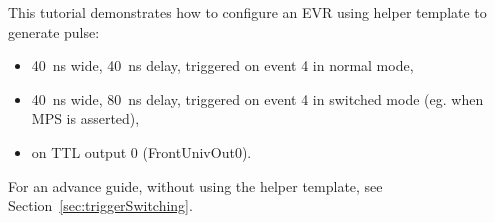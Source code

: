 \documentclass[12pt,a4paper]{article}
\begin{document}
This tutorial demonstrates how to configure an EVR using helper template to generate pulse:
\begin{itemize}
\item 40~ns wide, 40~ns delay, triggered on event 4 in normal mode,
\item 40~ns wide, 80~ns delay, triggered on event 4 in switched mode (eg. when MPS is asserted),
\item on TTL output 0 (FrontUnivOut0).
\end{itemize}
For an advance guide, without using the helper template, see Section~\ref{sec:triggerSwitching}.
\end{document}
